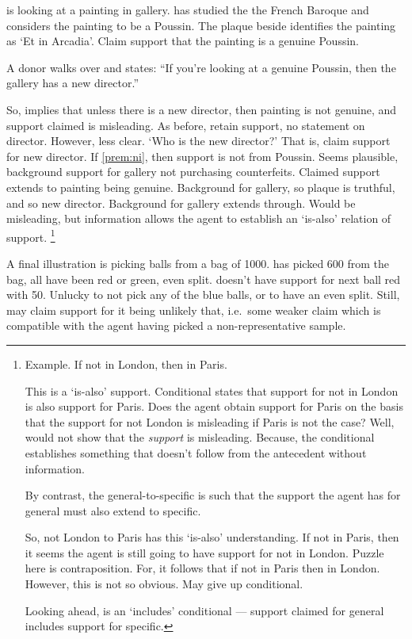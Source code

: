 \begin{note}
   is looking at a painting in gallery.
   has studied the the French Baroque and considers the painting to be a Poussin.
  The plaque beside identifies the painting as `Et in Arcadia'.
  Claim support that the painting is a genuine Poussin.

  A donor walks over and states:
  ``If you're looking at a genuine Poussin, then the gallery has a new director.''

  So, implies that unless there is a new director, then painting is not genuine, and support claimed is misleading.
  As before, retain support, no statement on director.
  However, less clear.
  `Who is the new director?'
  That is, claim support for new director.
  If \autoref{prem:ni}, then support is not from Poussin.
  Seems plausible, background support for gallery not purchasing counterfeits.
  Claimed support extends to painting being genuine.
  Background for gallery, so plaque is truthful, and so new director.
  Background for gallery extends through.
  Would be misleading, but information allows the agent to establish an `is-also' relation of support.\nolinebreak
  \footnote{
    Example.
    If not in London, then in Paris.

    This is a `is-also' support.
    Conditional states that support for not in London is also support for Paris.
    Does the agent obtain support for Paris on the basis that the support for not London is misleading if Paris is not the case?
    Well, would not show that the \emph{support} is misleading.
    Because, the conditional establishes something that doesn't follow from the antecedent without information.

    By contrast, the general-to-specific is such that the support the agent has for general must also extend to specific.

    So, not London to Paris has this `is-also' understanding.
    If not in Paris, then it seems the agent is still going to have support for not in London.
    Puzzle here is contraposition.
    For, it follows that if not in Paris then in London.
    However, this is not so obvious.
    May give up conditional.

    Looking ahead, \gsi{} is an `includes' conditional --- support claimed for general includes support for specific.
  }

  A final illustration is  picking balls from a bag of 1000.
   has picked 600 from the bag, all have been red or green, even split.
   doesn't have support for next ball red with 50.
  Unlucky to not pick any of the blue balls, or to have an even split.
  Still, may claim support for it being unlikely that, i.e.\ some weaker claim which is compatible with the agent having picked a non-representative sample.
\end{note}

